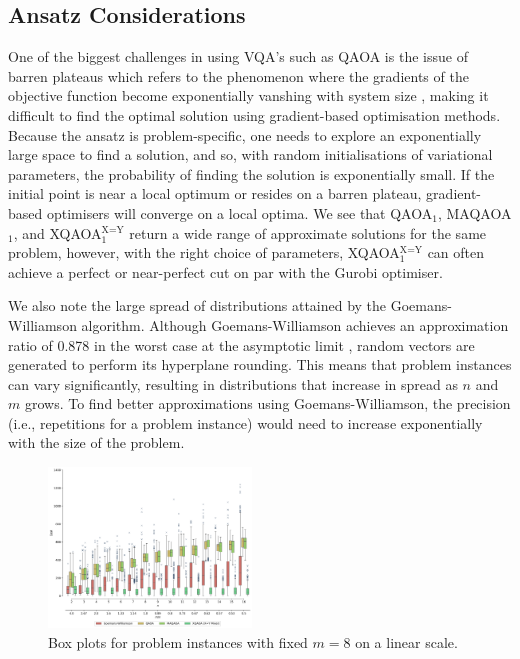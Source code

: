 \subsection{Ansatz Considerations} \label{disc:ansatz}
One of the biggest challenges in using VQA's such as QAOA is the issue of barren plateaus which refers to the phenomenon where the gradients of the objective function become exponentially vanshing with system size \cite{mcclean2018barren}, making it difficult to find the optimal solution using gradient-based optimisation methods. Because the ansatz is problem-specific, one needs to explore an exponentially large space to find a solution, and so, with random initialisations of variational parameters, the probability of finding the solution is exponentially small. If the initial point is near a local optimum or resides on a barren plateau, gradient-based optimisers will converge on a local optima. We see that QAOA$_1$, MAQAOA$_1$, and XQAOA$_1^\text{X=Y}$ return a wide range of approximate solutions for the same problem, however, with the right choice of parameters, XQAOA$_1^\text{X=Y}$ can often achieve a perfect or near-perfect cut on par with the Gurobi optimiser. 

We also note the large spread of distributions attained by the Goemans-Williamson algorithm. Although Goemans-Williamson achieves an approximation ratio of 0.878 in the worst case at the asymptotic limit \cite{goemans1994879}, random vectors are generated to perform its hyperplane rounding. This means that problem instances can vary significantly, resulting in distributions that increase in spread as $n$ and $m$ grows. To find better approximations using Goemans-Williamson, the precision (i.e., repetitions for a problem instance) would need to increase exponentially with the size of the problem.
\begin{figure}
    \centering
    \includegraphics[width=0.48\textwidth]{"../figures/fixed_m_normal.png"}
    \caption{Box plots for problem instances with fixed $m=8$ on a linear scale.}
    \label{fig:fixed_m_normal}
\end{figure}
